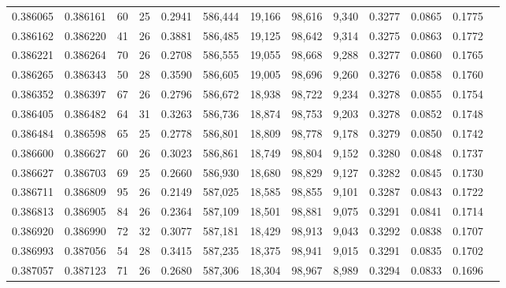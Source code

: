 \begin{tabular}{rrrrrrrrrrrrr}
0.386065 & 0.386161 &    60 &  25 &                                     0.2941 & 586,444 &  19,166 &  98,616 &   9,340 & 0.3277 & 0.0865 & 0.1775 \\
0.386162 & 0.386220 &    41 &  26 &                                     0.3881 & 586,485 &  19,125 &  98,642 &   9,314 & 0.3275 & 0.0863 & 0.1772 \\
0.386221 & 0.386264 &    70 &  26 &                                     0.2708 & 586,555 &  19,055 &  98,668 &   9,288 & 0.3277 & 0.0860 & 0.1765 \\
0.386265 & 0.386343 &    50 &  28 &                                     0.3590 & 586,605 &  19,005 &  98,696 &   9,260 & 0.3276 & 0.0858 & 0.1760 \\
0.386352 & 0.386397 &    67 &  26 &                                     0.2796 & 586,672 &  18,938 &  98,722 &   9,234 & 0.3278 & 0.0855 & 0.1754 \\
0.386405 & 0.386482 &    64 &  31 &                                     0.3263 & 586,736 &  18,874 &  98,753 &   9,203 & 0.3278 & 0.0852 & 0.1748 \\
0.386484 & 0.386598 &    65 &  25 &                                     0.2778 & 586,801 &  18,809 &  98,778 &   9,178 & 0.3279 & 0.0850 & 0.1742 \\
0.386600 & 0.386627 &    60 &  26 &                                     0.3023 & 586,861 &  18,749 &  98,804 &   9,152 & 0.3280 & 0.0848 & 0.1737 \\
0.386627 & 0.386703 &    69 &  25 &                                     0.2660 & 586,930 &  18,680 &  98,829 &   9,127 & 0.3282 & 0.0845 & 0.1730 \\
0.386711 & 0.386809 &    95 &  26 &                                     0.2149 & 587,025 &  18,585 &  98,855 &   9,101 & 0.3287 & 0.0843 & 0.1722 \\
0.386813 & 0.386905 &    84 &  26 &                                     0.2364 & 587,109 &  18,501 &  98,881 &   9,075 & 0.3291 & 0.0841 & 0.1714 \\
0.386920 & 0.386990 &    72 &  32 &                                     0.3077 & 587,181 &  18,429 &  98,913 &   9,043 & 0.3292 & 0.0838 & 0.1707 \\
0.386993 & 0.387056 &    54 &  28 &                                     0.3415 & 587,235 &  18,375 &  98,941 &   9,015 & 0.3291 & 0.0835 & 0.1702 \\
0.387057 & 0.387123 &    71 &  26 &                                     0.2680 & 587,306 &  18,304 &  98,967 &   8,989 & 0.3294 & 0.0833 & 0.1696 \\

\end{tabular}
